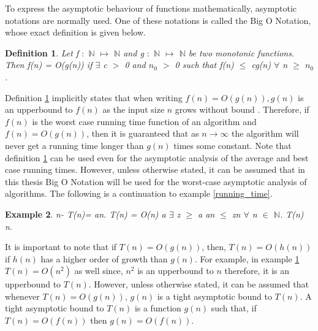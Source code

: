 \documentclass{article}
\newtheorem{definition}{Definition}[subsection]
\newtheorem{example}[definition]{Example}
\begin{document}
To express the asymptotic behaviour of functions mathematically, asymptotic notations are normally used. One of these notations is called the Big O Notation, whose exact definition is given below.
\begin{definition}
\label{bigonotation}
Let f $:$ $\mathbb{N}$ $\mapsto$ $\mathbb{N}$ and g $:$ $\mathbb{N}$ $\mapsto$ $\mathbb{N}$ be two monotonic functions. Then f(n) = O(g(n)) if $\exists$ c $>$ 0 and $n_0$ $>$ 0 such that f(n) $\leq$ cg(n) $\forall$ n $\geq$ $n_0$.  
\end{definition}
Definition \ref{bigonotation} implicitly states that when writing $\mathit{f(n) = O(g(n)), g(n)}$ is an upperbound to $\mathit{f(n)}$ as the input size $\mathit{n}$ grows without bound \cite{adamchik_2009}. Therefore, if $\mathit{f(n)}$ is the worst case running time function of an algorithm and $\mathit{f(n) = O(g(n))}$, then it is guaranteed that as $\mathit{n \rightarrow \infty}$ the algorithm will never get a running time longer than $\mathit{g(n)}$ times some constant. Note that definition \ref{bigonotation} can be used even for the asymptotic analysis of the average and best case running times. However, unless otherwise stated, it can be assumed that in this thesis Big O Notation will be used for the worst-case asymptotic analysis of algorithms. The following is a continuation to example \ref{running_time}.
\begin{example}
\label{bigonotationexample}
{} n-{} T(n)= an. {} T(n) = O(n) {} a  {} $\exists$ z $\geq$ a {} an $\leq$ zn $\forall$ n $\in$ $\mathbb{N}$. {} T(n) {} n.
\end{example}
It is important to note that if $\mathit{T(n) = O(g(n))}$, then, $\mathit{T(n) = O(h(n))}$ if $\mathit{h(n)}$ has a higher order of growth than $\mathit{g(n)}$. For example, in example \ref{bigonotation} $\mathit{T(n) = O(n^2)}$ as well since, $\mathit{n^2}$ is an upperbound to $\mathit{n}$ therefore, it is an upperbound to $\mathit{T(n)}$. However, unless otherwise stated, it can be assumed that whenever $\mathit{T(n) = O(g(n))}$, $\mathit{g(n)}$ is a tight asymptotic bound to $\mathit{T(n)}$. A tight asymptotic bound to $\mathit{T(n)}$ is a function $\mathit{g(n)}$ such that, if $\mathit{T(n)=O(f(n))}$ then $\mathit{g(n)=O(f(n))}$.\\\\
\end{document}
